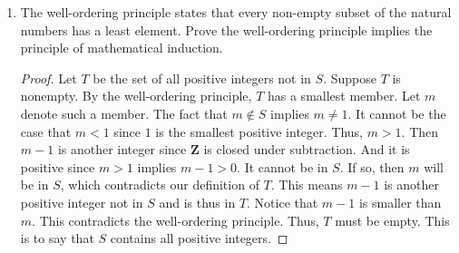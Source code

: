 \documentclass[a4paper]{article}
\begin{document}
\begin{enumerate}
  \begin{proof}
    Since \(f\) is integrable on \([0, 1]\), for any \(\epsilon > 0\), we
    can always find step functions \(s\) and \(t\) such that
    \(s \le f \le t\) and
    \[
      \int_0^1 t - \int_0^1 s < \epsilon.
    \]
    Let \(P = \brce{x_0, x_1, \dotsc, x_n}\) be a common partition for \(s\)
    and \(t\).  Denote \(s(x) = s_k\) and \(t(x) = t_k\) on every open
    interval \((x_{k-1}, x_k)\).  We construct two other step functions
    \begin{gather*}
      s'(x) =
      \begin{cases}
        s(x), & s(x) \ge 0, \\
        -t(x), & t(x) \le 0,
      \end{cases}
      \qand
      t'(x) =
      \begin{cases}
        t(x), & s(x) \ge 0, \\
        -s(x), & t(x) \le 0.
      \end{cases}
    \end{gather*}
    It is easy to verify that \(s' \le \abs{\,f} \le t'\) and
    \[
      \int_0^1 t' - \int_0^1 s' = \int_0^1 t - \int_0^1 s < \epsilon.
    \]
    This means that \(\abs{\,f}\) also satisfies the Riemann condition and
    is thus integrable.
  \end{proof}

\item The well-ordering principle states that every non-empty subset of
  the natural numbers has a least element.  Prove the well-ordering
  principle implies the principle of mathematical induction.

  \begin{proof}
    Let \(T\) be the set of all positive integers not in \(S\).  Suppose
    \(T\) is nonempty.  By the well-ordering principle, \(T\) has a smallest
    member.  Let \(m\) denote such a member.  The fact that \(m \notin S \)
    implies \(m \ne 1\).  It cannot be the case that \(m < 1\) since \(1\)
    is the smallest positive integer.  Thus, \(m > 1\).  Then \(m-1\) is
    another integer since \(\mathbf{Z}\) is closed under subtraction.  And
    it is positive since \(m > 1\) implies \(m-1>0\).  It cannot be in
    \(S\).  If so, then \(m\) will be in \(S\), which contradicts our
    definition of \(T\).  This means \(m-1\) is another positive integer not
    in \(S\) and is thus in \(T\).  Notice that \(m-1\) is smaller than
    \(m\).  This contradicts the well-ordering principle.  Thus, \(T\) must
    be empty.  This is to say that \(S\) contains all positive integers.
  \end{proof}


\end{enumerate}
\end{document}
